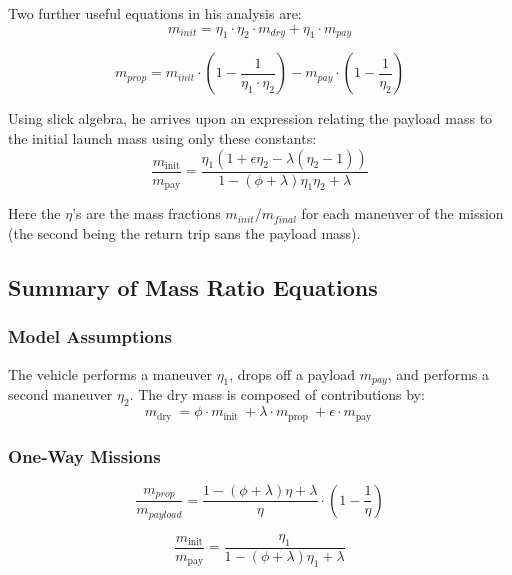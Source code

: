\documentclass{article}
\begin{document}
Two further useful equations in his analysis are:
\begin{equation}
m_{init} = \eta_1 \cdot \eta_2 \cdot m_{dry} + \eta_1 \cdot m_{pay}
\end{equation}

\begin{equation}
m_{prop} = m_{init} \cdot \left(1 - \frac{1}{\eta_1 \cdot \eta_2}\right) - m_{pay} \cdot \left(1- \frac{1}{\eta_2}\right)
\end{equation}

Using slick algebra, he arrives upon an expression relating the payload mass to the initial launch mass using only these constants:
\begin{equation}
\frac{m_{\text {init}}}{m_{\text {pay}}}=\frac{\eta_{1}\left(1+\epsilon \eta_{2}-\lambda\left(\eta_{2}-1\right)\right)}{1-(\phi+\lambda) \eta_{1} \eta_{2}+\lambda}
\end{equation}

Here the $\eta$'s are the mass fractions $m_{init}/m_{final}$ for each maneuver of the mission (the second being the return trip sans the payload mass).

\subsection{Summary of Mass Ratio Equations}
\subsubsection{Model Assumptions}
The vehicle performs a maneuver $\eta_1$, drops off a payload $m_{pay}$, and performs a second maneuver $\eta_2$. The dry mass is composed of contributions by:
\begin{equation}
m_{\text {dry }}=\phi \cdot m_{\text {init }}+\lambda \cdot  m_{\text {prop }}+\epsilon \cdot m_{\text {pay }}
\end{equation}

\subsubsection{One-Way Missions}
\begin{equation}
\frac{m_{prop}}{m_{payload}} = \frac{1- (\phi +\lambda) \eta +\lambda}{\eta} \cdot \left(1- \frac{1}{\eta}\right)
\end{equation}

\begin{equation}
\frac{m_{\text {init}}}{m_{\text {pay}}}=\frac{\eta_{1}}{1-(\phi+\lambda) \eta_{1} +\lambda}
\end{equation}
\end{document}
